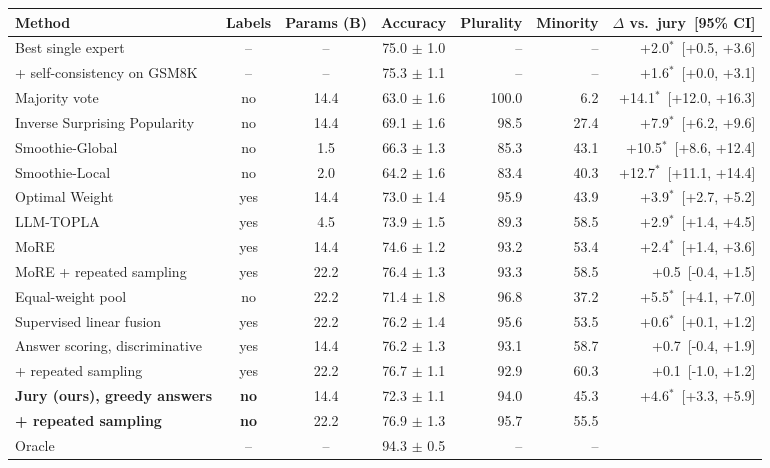 \begin{tabular}{>{\raggedright\arraybackslash}p{5.2cm}cccrrr}
\toprule
Method & Labels & Params (B) & Accuracy & Plurality & Minority & $\Delta$ vs.\ jury~[95\% CI] \\
\midrule
Best single expert & -- & -- & 75.0 $\pm$ 1.0 & -- & -- & +2.0$^{*}$~[+0.5, +3.6] \\
\quad + self-consistency on GSM8K & -- & -- & 75.3 $\pm$ 1.1 & -- & -- & +1.6$^{*}$~[+0.0, +3.1] \\
\midrule
Majority vote~\cite{li2024moreagents} & no & 14.4 & 63.0 $\pm$ 1.6 & 100.0 & 6.2 & +14.1$^{*}$~[+12.0, +16.3] \\
Inverse Surprising Popularity~\cite{prelec2017surprising,beyondmajority2025} & no & 14.4 & 69.1 $\pm$ 1.6 & 98.5 & 27.4 & +7.9$^{*}$~[+6.2, +9.6] \\
Smoothie-Global~\cite{guha2024smoothie} & no & 1.5 & 66.3 $\pm$ 1.3 & 85.3 & 43.1 & +10.5$^{*}$~[+8.6, +12.4] \\
Smoothie-Local~\cite{guha2024smoothie} & no & 2.0 & 64.2 $\pm$ 1.6 & 83.4 & 40.3 & +12.7$^{*}$~[+11.1, +14.4] \\
Optimal Weight~\cite{nitzan1982optimal,beyondmajority2025} & yes & 14.4 & 73.0 $\pm$ 1.4 & 95.9 & 43.9 & +3.9$^{*}$~[+2.7, +5.2] \\
LLM-TOPLA~\cite{tekin2024topla} & yes & 4.5 & 73.9 $\pm$ 1.5 & 89.3 & 58.5 & +2.9$^{*}$~[+1.4, +4.5] \\
MoRE~\cite{si2023more} & yes & 14.4 & 74.6 $\pm$ 1.2 & 93.2 & 53.4 & +2.4$^{*}$~[+1.4, +3.6] \\
MoRE + repeated sampling~\cite{si2023more} & yes & 22.2 & 76.4 $\pm$ 1.3 & 93.3 & 58.5 & +0.5~[-0.4, +1.5] \\
Equal-weight pool~\cite{stone1961opinion} & no & 22.2 & 71.4 $\pm$ 1.8 & 96.8 & 37.2 & +5.5$^{*}$~[+4.1, +7.0] \\
Supervised linear fusion~\cite{stone1961opinion,beyondmajority2025} & yes & 22.2 & 76.2 $\pm$ 1.4 & 95.6 & 53.5 & +0.6$^{*}$~[+0.1, +1.2] \\
\midrule
Answer scoring, discriminative & yes & 14.4 & 76.2 $\pm$ 1.3 & 93.1 & 58.7 & +0.7~[-0.4, +1.9] \\
\quad + repeated sampling & yes & 22.2 & 76.7 $\pm$ 1.1 & 92.9 & 60.3 & +0.1~[-1.0, +1.2] \\
\textbf{Jury (ours), greedy answers} & \textbf{no} & 14.4 & 72.3 $\pm$ 1.1 & 94.0 & 45.3 & +4.6$^{*}$~[+3.3, +5.9] \\
\textbf{\quad + repeated sampling} & \textbf{no} & 22.2 & 76.9 $\pm$ 1.3 & 95.7 & 55.5 &  \\
\midrule
Oracle & -- & -- & 94.3 $\pm$ 0.5 & -- & -- & \\
\bottomrule
\end{tabular}
